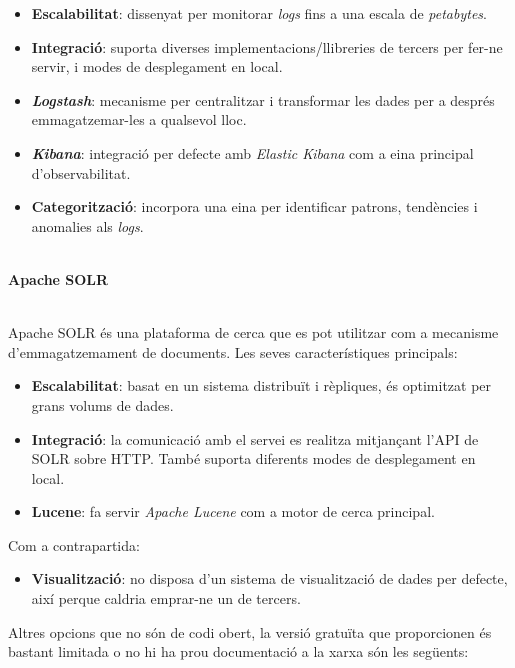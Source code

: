 \begin{itemize}
    \item \textbf{Escalabilitat}: dissenyat per monitorar \textit{\gls{log}s} fins a una escala de \textit{petabytes}.
    \item \textbf{Integració}: suporta diverses implementacions/llibreries de tercers per fer-ne servir, i modes de desplegament en local.
    \item \textbf{\textit{Logstash}}: mecanisme per centralitzar i transformar les dades per a després emmagatzemar-les a qualsevol lloc.
    \item \textbf{\textit{Kibana}}: integració per defecte amb \textit{Elastic Kibana} com a eina principal d’observabilitat.
    \item \textbf{Categorització}: incorpora una eina per identificar patrons, tendències i anomalies als \textit{\gls{log}s}.
\end{itemize}


\noindent \\
\textbf{Apache SOLR~\cite{SOLR}}

\noindent \\
Apache SOLR és una plataforma de cerca que es pot utilitzar com a mecanisme d’emmagatzemament de documents. 
Les seves característiques principals:

\begin{itemize}
    \item \textbf{Escalabilitat}: basat en un sistema distribuït i rèpliques, és optimitzat per grans volums de dades.
    \item \textbf{Integració}: la comunicació amb el servei es realitza mitjançant l’\gls{API} de SOLR sobre \gls{HTTP}.
    També suporta diferents modes de desplegament en local.
    \item \textbf{Lucene}: fa servir \textit{Apache Lucene} com a motor de cerca principal.
\end{itemize}

\noindent
Com a contrapartida:

\begin{itemize}
    \item \textbf{Visualització}: no disposa d’un sistema de visualització de dades per defecte, així perque caldria emprar-ne un de tercers.
\end{itemize}


\clearpage

\noindent
Altres opcions que no són de codi obert, la versió gratuïta que proporcionen és bastant limitada o no hi ha prou documentació a la xarxa són les següents:

